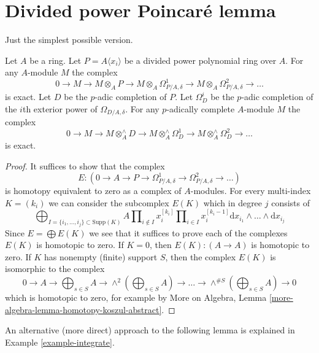 \section{Divided power Poincar\'e lemma}
\label{section-poincare}

\noindent
Just the simplest possible version.

\begin{lemma}
\label{lemma-poincare}
Let $A$ be a ring. Let $P = A\langle x_i \rangle$ be a divided
power polynomial ring over $A$. For any $A$-module $M$ the complex
$$
0 \to M \to
M \otimes_A P \to
M \otimes_A \Omega^1_{P/A, \delta} \to
M \otimes_A \Omega^2_{P/A, \delta} \to \ldots
$$
is exact. Let $D$ be the $p$-adic completion of $P$.
Let $\Omega^i_D$ be the $p$-adic completion of the $i$th exterior
power of $\Omega_{D/A, \delta}$. For any $p$-adically complete
$A$-module $M$ the complex
$$
0 \to M \to
M \otimes^\wedge_A D \to
M \otimes^\wedge_A \Omega^1_D \to
M \otimes^\wedge_A \Omega^2_D \to \ldots
$$
is exact.
\end{lemma}

\begin{proof}
It suffices to show that the complex
$$
E :
(0 \to A \to P \to \Omega^1_{P/A, \delta} \to
\Omega^2_{P/A, \delta} \to \ldots)
$$
is homotopy equivalent to zero as a complex of $A$-modules.
For every multi-index $K = (k_i)$ we can consider the subcomplex $E(K)$
which in degree $j$ consists of
$$
\bigoplus\nolimits_{I = \{i_1, \ldots, i_j\} \subset \text{Supp}(K)}
A
\prod\nolimits_{i \not \in I} x_i^{[k_i]}
\prod\nolimits_{i \in I} x_i^{[k_i - 1]}
\text{d}x_{i_1} \wedge \ldots \wedge \text{d}x_{i_j}
$$
Since $E = \bigoplus E(K)$ we see that it suffices to prove each of the
complexes $E(K)$ is homotopic to zero. If $K = 0$, then
$E(K) : (A \to A)$ is homotopic to zero. If $K$ has nonempty (finite)
support $S$, then the complex $E(K)$ is isomorphic to the complex
$$
0 \to A \to
\bigoplus\nolimits_{s \in S} A \to
\wedge^2(\bigoplus\nolimits_{s \in S} A) \to
\ldots \to \wedge^{\#S}(\bigoplus\nolimits_{s \in S} A) \to 0
$$
which is homotopic to zero, for example by
More on Algebra, Lemma \ref{more-algebra-lemma-homotopy-koszul-abstract}.
\end{proof}

\noindent
An alternative (more direct) approach to the following lemma is
explained in Example \ref{example-integrate}.

